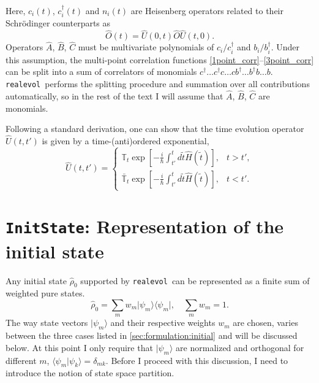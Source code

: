 \documentclass[]{article}
\newcommand{\realevol}{\texttt{realevol}}
\newcommand{\bra}[1]{\ensuremath{\langle#1|}}
\newcommand{\ket}[1]{\ensuremath{|#1\rangle}}
\begin{document}
Here, $c_i(t)$, $c^\dagger_i(t)$ and $n_i(t)$ are Heisenberg operators related to their Schr\"odinger counterparts as
\begin{equation}
    \hat O(t) = \hat U(0,t)\hat O \hat U(t,0).
\end{equation}
Operators $\hat A$, $\hat B$, $\hat C$ must be multivariate polynomials
of $c_i/c^\dagger_i$ and $b_i/b^\dagger_i$. Under this assumption, the multi-point correlation functions \ref{1point_corr}--\ref{3point_corr} can be split into a sum of correlators of monomials $c^\dagger\ldots c^\dagger c \ldots c b^\dagger \ldots b^\dagger b \ldots b$. \realevol\ performs the splitting procedure and summation over all contributions automatically, so in the rest of the text I will assume that $\hat A$, $\hat B$, $\hat C$ are monomials.

Following a standard derivation, one can show that the time evolution operator $\hat U(t,t')$ is given by a time-(anti)ordered exponential,
\begin{equation}
    \hat U(t,t') = \left\{
        \begin{array}{ll}
        \mathbb{T}_t\exp\left[
        -\frac{i}{\hbar}\int_{t'}^t d\tilde t\hat H(\tilde t) \right], &t>t',\\
        \mathbb{\bar T}_t\exp\left[
        -\frac{i}{\hbar}\int_{t'}^t d\tilde t\hat H(\tilde t) \right], &t<t'.
        \end{array}
    \right.
\end{equation}

\section{\label{sec:init_state}\texttt{InitState}: Representation of the initial state}

Any initial state $\hat\rho_0$ supported by \realevol\ can be represented as a finite sum of weighted pure states.
\begin{equation}
    \hat\rho_0 = \sum_m w_m \ket{\psi_m}\bra{\psi_m},\quad\sum_m w_m = 1.
\end{equation}
The way state vectors $\ket{\psi_m}$ and their respective weights $w_m$ are chosen, varies between the three cases listed in \ref{sec:formulation:initial} and will be discussed below.
At this point I only require that $\ket{\psi_m}$ are normalized and orthogonal for different $m$, $\langle\psi_m|\psi_k\rangle = \delta_{mk}$.
Before I proceed with this discussion, I need to introduce the notion of state space partition.
\end{document}
